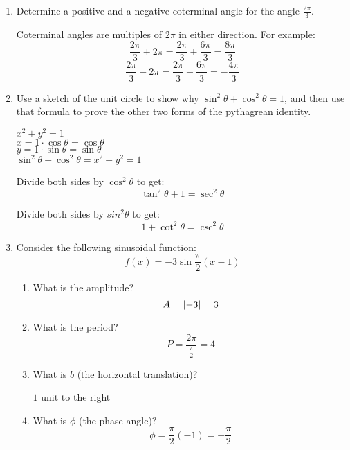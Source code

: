 \documentclass[letterpaper,12pt,fleqn]{article}
\renewcommand{\o}{\theta}
\begin{document}
\begin{enumerate}
\item Determine a positive and a negative coterminal angle for the angle
  $\frac{2\pi}{3}$.

  Coterminal angles are multiples of $2\pi$ in either direction. For example:
  \[\frac{2\pi}{3}+2\pi=\frac{2\pi}{3}+\frac{6\pi}{3}=\frac{8\pi}{3}\]
  \[\frac{2\pi}{3}-2\pi=\frac{2\pi}{3}-\frac{6\pi}{3}=-\frac{4\pi}{3}\]

\item Use a sketch of the unit circle to show why $\sin^2\o+\cos^2\o=1$, and
then use that formula to prove the other two forms of the pythagrean identity.

\begin{minipage}{3in}
\end{minipage}
\begin{minipage}{3in}
$x^2+y^2=1$ \\
$x=1\cdot\cos\o=\cos\o$ \\
$y=1\cdot\sin\o=\sin\o$ \\
$\sin^2\o+\cos^2\o=x^2+y^2=1$
\end{minipage}

Divide both sides by $\cos^2\o$ to get:
\[\tan^2\o+1=\sec^2\o\]

Divide both sides by $sin^2\o$ to get:
\[1+\cot^2\o=\csc^2\o\]

\item Consider the following sinusoidal function:
\[f(x)=-3\sin\frac{\pi}{2}(x-1)\]
\begin{enumerate}
\item What is the amplitude?
  \[A=\lvert-3\rvert=3\]
  
\item What is the period?
  \[P=\frac{2\pi}{\frac{\pi}{2}}=4\]

\item What is $b$ (the horizontal translation)?

  $1$ unit to the right

\item What is $\phi$ (the phase angle)?
  \[\phi=\frac{\pi}{2}(-1)=-\frac{\pi}{2}\]


\end{enumerate}
\end{enumerate}
\end{document}
